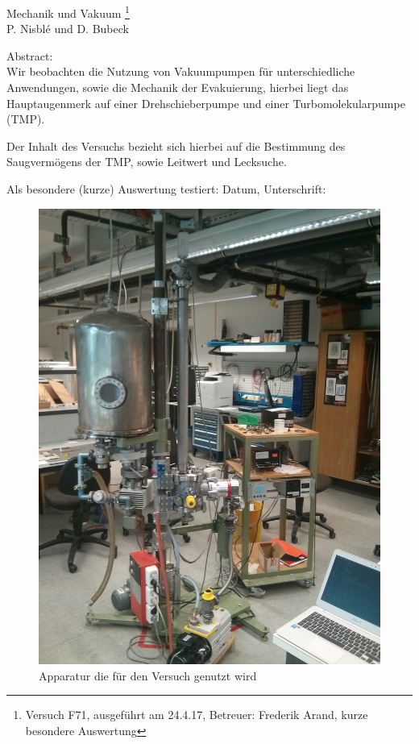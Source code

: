 \documentclass[12pt, a4paper]{scrartcl}
\begin{document}
	
	\thispagestyle{empty}
	\null\vspace{40mm}
	\begin{center}
		{
			\Large Mechanik und Vakuum
			\footnote{
				\noindent Versuch F71, ausgeführt am 24.4.17,
				Betreuer: Frederik Arand,
				kurze besondere Auswertung
			}
		}\\[15mm]
		P. Nisblé und D. Bubeck
		
		\vspace{25mm}
		
		\parbox{0.9\textwidth}{
			Abstract:\\    
			\small Wir beobachten die Nutzung von Vakuumpumpen für unterschiedliche Anwendungen, sowie die Mechanik der Evakuierung, hierbei liegt das Hauptaugenmerk auf einer Drehschieberpumpe und einer Turbomolekularpumpe (TMP).
            
            Der Inhalt des Versuchs bezieht sich hierbei auf die Bestimmung des Saugvermögens der TMP, sowie Leitwert und Lecksuche.
		}
	\end{center}
	
	\vfill
	Als besondere (kurze) Auswertung testiert: Datum, Unterschrift:
	\vspace{20mm}
	\newpage  
	\null\thispagestyle{empty} 
	
	\begin{figure}[H]
		\centering
		\includegraphics[height=.6\paperheight]{foto1}
		\caption{Apparatur die für den Versuch genutzt wird}
	\end{figure}
	
\end{document}
